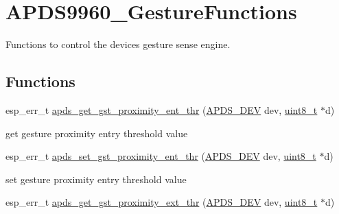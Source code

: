 \hypertarget{group__APDS9960__GestureFunctions}{}\section{A\+P\+D\+S9960\+\_\+\+Gesture\+Functions}
\label{group__APDS9960__GestureFunctions}


Functions to control the device\textquotesingle{}s gesture sense engine.  


\subsection*{Functions}
\begin{DoxyCompactItemize}
\item 
esp\+\_\+err\+\_\+t \hyperlink{group__APDS9960__GestureFunctions_gaea600a8b11dacef10ed4b413f7fe1f15}{apds\+\_\+get\+\_\+gst\+\_\+proximity\+\_\+ent\+\_\+thr} (\hyperlink{structAPDS9960__Driver}{A\+P\+D\+S\+\_\+\+D\+EV} dev, \hyperlink{vl53l0x__types_8h_aba7bc1797add20fe3efdf37ced1182c5}{uint8\+\_\+t} $\ast$d)
\begin{DoxyCompactList}\small\item\em 
\begin{DoxyItemize}
\item get gesture proximity entry threshold value 
\end{DoxyItemize}\end{DoxyCompactList}\item 
esp\+\_\+err\+\_\+t \hyperlink{group__APDS9960__GestureFunctions_gaa0edf3a2043b3718b079b1a6adf301e9}{apds\+\_\+set\+\_\+gst\+\_\+proximity\+\_\+ent\+\_\+thr} (\hyperlink{structAPDS9960__Driver}{A\+P\+D\+S\+\_\+\+D\+EV} dev, \hyperlink{vl53l0x__types_8h_aba7bc1797add20fe3efdf37ced1182c5}{uint8\+\_\+t} $\ast$d)
\begin{DoxyCompactList}\small\item\em 
\begin{DoxyItemize}
\item set gesture proximity entry threshold value 
\end{DoxyItemize}\end{DoxyCompactList}\item 
esp\+\_\+err\+\_\+t \hyperlink{group__APDS9960__GestureFunctions_ga738bd08725c40599d71954e720fab391}{apds\+\_\+get\+\_\+gst\+\_\+proximity\+\_\+ext\+\_\+thr} (\hyperlink{structAPDS9960__Driver}{A\+P\+D\+S\+\_\+\+D\+EV} dev, \hyperlink{vl53l0x__types_8h_aba7bc1797add20fe3efdf37ced1182c5}{uint8\+\_\+t} $\ast$d)

\end{DoxyCompactItemize}

